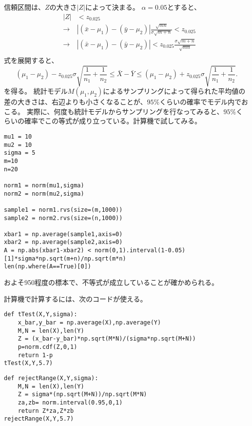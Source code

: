信頼区間は、$Z$の大きさ$|Z|$によって決まる。
$\alpha=0.05$とすると、
\begin{eqnarray*}
&|Z|& < z_{0.025}\\
&\rightarrow & |(\bar{x}-\mu_1)-(\bar{y}-\mu_2)|\frac{\sqrt{mn}}{\sigma\sqrt{m+n}} < z_{0.025}\\
&\rightarrow& |(\bar{x}-\mu_1)-(\bar{y}-\mu_2)| <z_{0.025}\frac{ \sigma\sqrt{m+n} }{ \sqrt{mn }}\\
\end{eqnarray*}
式を展開すると、
\begin{equation*}
    (\mu_1-\mu_2)-z_{0.025}\sigma\sqrt{\frac{1}{n_1}+\frac{1}{n_2}} \leq \bar{X}-\bar{Y} \leq (\mu_1-\mu_2)+z_{0.025}\sigma\sqrt{\frac{1}{n_1}+\frac{1}{n_2}}.
\end{equation*}
を得る。
統計モデル$M(\mu_1,\mu_2)$によるサンプリングによって得られた平均値の差の大きさは、右辺よりも小さくなることが、$95\%$くらいの確率でモデル内でおこる。
実際に、何度も統計モデルからサンプリングを行なってみると、$95\%$くらいの確率でこの等式が成り立っている。計算機で試してみる。
\begin{lstlisting}
mu1 = 10
mu2 = 10
sigma = 5
m=10
n=20

norm1 = norm(mu1,sigma)
norm2 = norm(mu2,sigma)

sample1 = norm1.rvs(size=(m,1000))
sample2 = norm2.rvs(size=(n,1000))

xbar1 = np.average(sample1,axis=0)
xbar2 = np.average(sample2,axis=0)
A = np.abs(xbar1-xbar2) < norm(0,1).interval(1-0.05)[1]*sigma*np.sqrt(m+n)/np.sqrt(m*n)
len(np.where(A==True)[0])
\end{lstlisting}
およそ950程度の標本で、不等式が成立していることが確かめられる。

計算機で計算するには、次のコードが使える。
\begin{lstlisting}
def tTest(X,Y,sigma):
    x_bar,y_bar = np.average(X),np.average(Y)
    M,N = len(X),len(Y)
    Z = (x_bar-y_bar)*np.sqrt(M*N)/(sigma*np.sqrt(M+N))
    p=norm.cdf(Z,0,1)
    return 1-p
tTest(X,Y,5.7)
\end{lstlisting}


\begin{lstlisting}
def rejectRange(X,Y,sigma):
    M,N = len(X),len(Y)
    Z = sigma*(np.sqrt(M+N))/np.sqrt(M*N)
    za,zb= norm.interval(0.95,0,1)
    return Z*za,Z*zb
rejectRange(X,Y,5.7)
\end{lstlisting}



